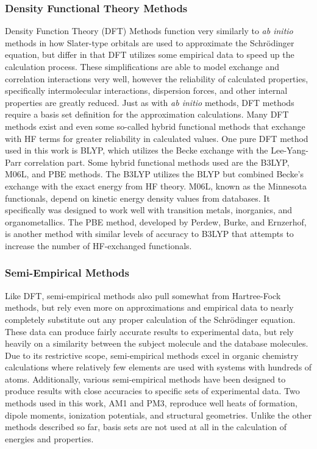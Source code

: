 \subsubsection{Density Functional Theory Methods}

Density Function Theory (DFT) Methods function very similarly to \textit{ab initio} methods in how Slater-type orbitals are used to approximate the Schr\"{o}dinger equation, but differ in that DFT utilizes some empirical data to speed up the calculation process.\cite{DFT}
These simplifications are able to model exchange and correlation interactions very well, however the reliability of calculated properties, specifically intermolecular interactions, dispersion forces, and other internal properties are greatly reduced.
Just as with \textit{ab initio} methods, DFT methods require a basis set definition for the approximation calculations.
Many DFT methods exist and even some so-called hybrid functional methods that exchange with HF terms for greater reliability in calculated values.
One pure DFT method used in this work is BLYP, which utilizes  the Becke exchange with the Lee-Yang-Parr correlation part.
Some hybrid functional methods used are the B3LYP, M06L, and PBE methods.
The B3LYP utilizes the BLYP but combined Becke's exchange with the exact energy from HF theory.
M06L, known as the Minnesota functionals, depend on kinetic energy density values from databases.
It specifically was designed to work well with transition metals, inorganics, and organometallics.\cite{M06L}
The PBE method, developed by Perdew, Burke, and Ernzerhof,  is another method with similar levels of accuracy to B3LYP that attempts to increase the number of HF-exchanged functionals.\cite{PBE}

\subsubsection{Semi-Empirical Methods}

Like DFT, semi-empirical methods also pull somewhat from Hartree-Fock methods, but rely even more on approximations and empirical data to nearly completely substitute out any proper calculation of the Schr\"{o}dinger equation.
These data can produce fairly accurate results to experimental data, but rely heavily on a similarity between the subject molecule and the database molecules.
Due to its restrictive scope, semi-empirical methods excel in organic chemistry calculations where relatively few elements are used with systems with hundreds of atoms.\cite{huckel}
Additionally, various semi-empirical methods have been designed to produce results with close accuracies to specific sets of experimental data.
Two methods used in this work, AM1\cite{AM1} and PM3,\cite{PM3} reproduce well heats of formation, dipole moments, ionization potentials, and structural geometries.
Unlike the other methods described so far, basis sets are not used at all in the calculation of energies and properties.

